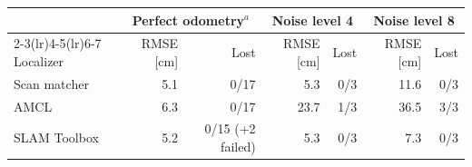 \begin{tabular}{lrrrrrr}
\toprule
 & \multicolumn{2}{c}{Perfect odometry${}^{a}$} & \multicolumn{2}{c}{Noise level 4} & \multicolumn{2}{c}{Noise level 8} \\
\cmidrule(lr){2-3}\cmidrule(lr){4-5}\cmidrule(lr){6-7}
Localizer & RMSE [cm] & Lost & RMSE [cm] & Lost & RMSE [cm] & Lost \\
\midrule
Scan matcher & 5.1 & 0/17 & 5.3 & 0/3 & 11.6 & 0/3 \\
AMCL & 6.3 & 0/17 & 23.7 & 1/3 & 36.5 & 3/3 \\
SLAM Toolbox & 5.2 & 0/15 (+2 failed) & 5.3 & 0/3 & 7.3 & 0/3 \\
\bottomrule
\end{tabular}

